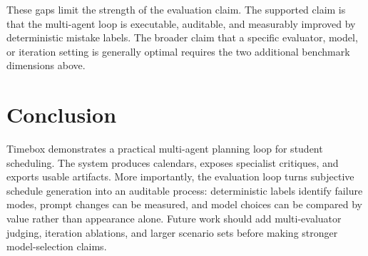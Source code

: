 \documentclass[sigconf,nonacm]{acmart}
\begin{document}
These gaps limit the strength of the evaluation claim. The supported claim is that the multi-agent loop is executable, auditable, and measurably improved by deterministic mistake labels. The broader claim that a specific evaluator, model, or iteration setting is generally optimal requires the two additional benchmark dimensions above.

\section{Conclusion}
Timebox demonstrates a practical multi-agent planning loop for student scheduling. The system produces calendars, exposes specialist critiques, and exports usable artifacts. More importantly, the evaluation loop turns subjective schedule generation into an auditable process: deterministic labels identify failure modes, prompt changes can be measured, and model choices can be compared by value rather than appearance alone. Future work should add multi-evaluator judging, iteration ablations, and larger scenario sets before making stronger model-selection claims.
\end{document}

